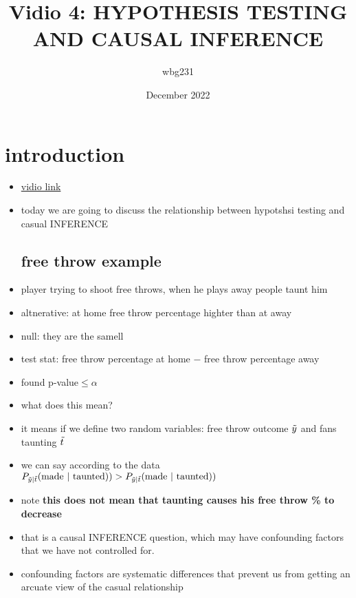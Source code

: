 \documentclass{article}
\title{Vidio 4: HYPOTHESIS TESTING AND CAUSAL INFERENCE}
\author{wbg231 }
\date{December 2022}
\begin{document}
\maketitle

\section*{introduction}
\begin{itemize}
\item \href{https://www.youtube.com/watch?v=2tPcuzu8oXM&list=PLBEf5mJtE6KuZ5NBQMuWIMsiOOrV9ibzm&index=85}{vidio link}
\item today we are going to discuss the relationship between hypotshsi testing and casual INFERENCE
\subsection*{free throw example}
\item player trying to shoot free throws, when he plays away people taunt him 
\item altnerative: at home free throw percentage highter than at away
\item null: they are the samell
\item test stat: free throw percentage at home $-$ free throw percentage away
\item found p-value$\leq \alpha$
\item what does this mean?
\item it means if we define two random variables: free throw outcome $\Tilde{y}$ and fans taunting $\Tilde{t}$ 
\item we can say according to the data $P_{\Tilde{y}|\Tilde{t}}(\text{made | taunted}))>P_{\Tilde{y}|\Tilde{t}}(\text{made | taunted}))$
\item note \textbf{this does not mean that taunting causes his free throw \% to decrease }
\item that is a causal INFERENCE question, which may have confounding factors that we have not controlled for. 
\item confounding factors are systematic differences that prevent us from getting an arcuate view of the casual relationship

\end{itemize}
\end{document}
